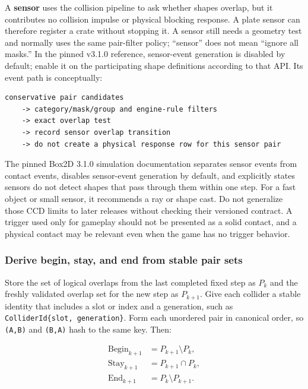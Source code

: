 A \textbf{sensor} uses the collision pipeline to ask whether shapes overlap, but it contributes no collision impulse or physical blocking response. A plate sensor can therefore register a crate without stopping it. A sensor still needs a geometry test and normally uses the same pair-filter policy; ``sensor'' does not mean ``ignore all masks.'' In the pinned v3.1.0 reference, sensor-event generation is disabled by default; enable it on the participating shape definitions according to that API. Its event path is conceptually:

\begin{verbatim}
conservative pair candidates
    -> category/mask/group and engine-rule filters
    -> exact overlap test
    -> record sensor overlap transition
    -> do not create a physical response row for this sensor pair
\end{verbatim}

The pinned Box2D 3.1.0 simulation documentation separates sensor events from contact events, disables sensor-event generation by default, and explicitly states sensors do not detect shapes that pass through them within one step. For a fast object or small sensor, it recommends a ray or shape cast. Do not generalize those CCD limits to later releases without checking their versioned contract. A trigger used only for gameplay should not be presented as a solid contact, and a physical contact may be relevant even when the game has no trigger behavior.

\subsubsection{Derive begin, stay, and end from stable pair sets}\label{05-engine-i-ch017-derive-begin-stay-and-end-from-stable-pair-sets}

Store the set of logical overlaps from the last completed fixed step as \(P_k\) and the freshly validated overlap set for the new step as \(P_{k+1}\). Give each collider a stable identity that includes a slot or index and a generation, such as \texttt{ColliderId\{slot,\ generation\}}. Form each unordered pair in canonical order, so \texttt{(A,B)} and \texttt{(B,A)} hash to the same key. Then:

\[
\begin{aligned}\mathrm{Begin}_{k+1} &= P_{k+1} \setminus P_k,\\\mathrm{Stay}_{k+1} &= P_{k+1} \cap P_k,\\\mathrm{End}_{k+1} &= P_k \setminus P_{k+1}.\end{aligned}
\]

